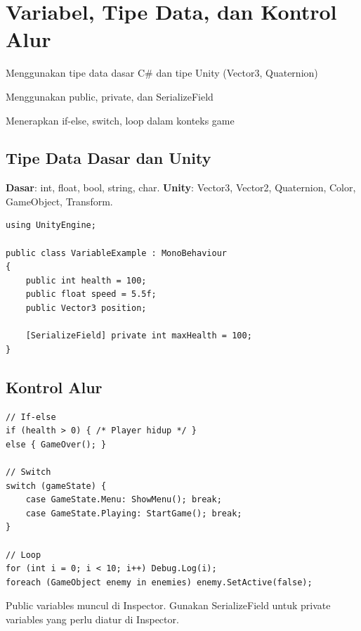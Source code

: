 \section{Variabel, Tipe Data, dan Kontrol Alur}

\begin{learningoutcomes}
\item Menggunakan tipe data dasar C\# dan tipe Unity (Vector3, Quaternion)
\item Menggunakan public, private, dan SerializeField
\item Menerapkan if-else, switch, loop dalam konteks game
\end{learningoutcomes}

\subsection{Tipe Data Dasar dan Unity}

\textbf{Dasar}: int, float, bool, string, char. \textbf{Unity}: Vector3, Vector2, Quaternion, Color, GameObject, Transform.

\begin{lstlisting}[language={[Sharp]C}]
using UnityEngine;

public class VariableExample : MonoBehaviour
{
    public int health = 100;
    public float speed = 5.5f;
    public Vector3 position;
    
    [SerializeField] private int maxHealth = 100;
}
\end{lstlisting}

\subsection{Kontrol Alur}

\begin{lstlisting}[language={[Sharp]C}]
// If-else
if (health > 0) { /* Player hidup */ }
else { GameOver(); }

// Switch
switch (gameState) {
    case GameState.Menu: ShowMenu(); break;
    case GameState.Playing: StartGame(); break;
}

// Loop
for (int i = 0; i < 10; i++) Debug.Log(i);
foreach (GameObject enemy in enemies) enemy.SetActive(false);
\end{lstlisting}

\begin{catatan}
Public variables muncul di Inspector. Gunakan SerializeField untuk private variables yang perlu diatur di Inspector.
\end{catatan}
